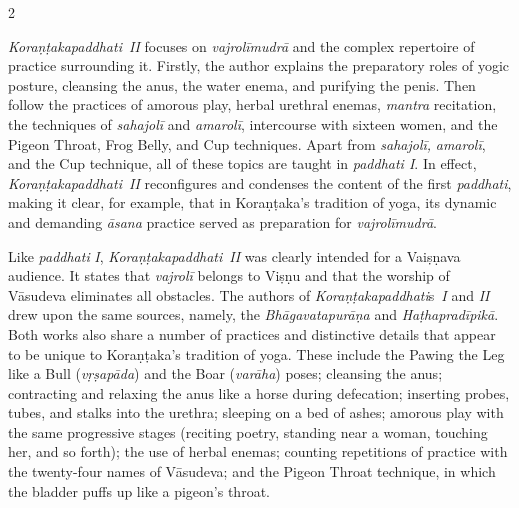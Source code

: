 \begin{nohyp}
\begin{multicols*}{2}
\begin{eng}
\label{koraux1e47ux1e6dakapaddhati-ii}
\vskip 7pt

\noindent
\emph{Koraṇṭakapaddhati}~\emph{II} focuses on \emph{vajrolīmudrā} and the complex repertoire of practice surrounding it. Firstly, the author explains the preparatory roles of yogic posture, cleansing the anus, the water enema, and purifying the penis. Then follow the practices of amorous play, herbal urethral enemas, \emph{mantra} recitation, the techniques of \emph{sahajolī} and \emph{amarolī}, intercourse with sixteen women, and the Pigeon Throat, Frog Belly, and Cup techniques. Apart from \emph{sahajolī,} \emph{amarolī}, and the Cup technique, all of these topics are taught in \emph{paddhati I}. In effect, \emph{Koraṇṭakapaddhati}~\emph{II} reconfigures and condenses the content of the first \emph{paddhati}, making it clear, for example, that in Koraṇṭaka's tradition of yoga, its dynamic and demanding \emph{āsana} practice served as preparation for \emph{vajrolīmudrā}.

Like \emph{paddhati} \emph{I}, \emph{Koraṇṭakapaddhati}~\emph{II} was clearly intended for a Vaiṣṇava audience. It states that \emph{vajrolī} belongs to Viṣṇu and that the worship of Vāsudeva eliminates all obstacles. The authors of \emph{Koraṇṭakapaddhati}s~\emph{I} and \emph{II} drew upon the same sources, namely, the \emph{Bhāgavatapurāṇa} and \emph{Haṭhapradīpikā}. Both works also share a number of practices and distinctive details that appear to be unique to Koraṇṭaka's tradition of yoga. These include the Pawing the Leg like a Bull (\emph{vṛṣapāda}) and the Boar (\emph{varāha}) poses; cleansing the anus; contracting and relaxing the anus like a horse during defecation; inserting probes, tubes, and stalks into the urethra; sleeping on a bed of ashes; amorous play with the same progressive stages (reciting poetry, standing near a woman, touching her, and so forth); the use of herbal enemas; counting repetitions of practice with the twenty-four names of Vāsudeva; and the Pigeon Throat technique, in which the bladder puffs up like a pigeon's throat.


\end{eng}
\end{multicols*}
\end{nohyp}
